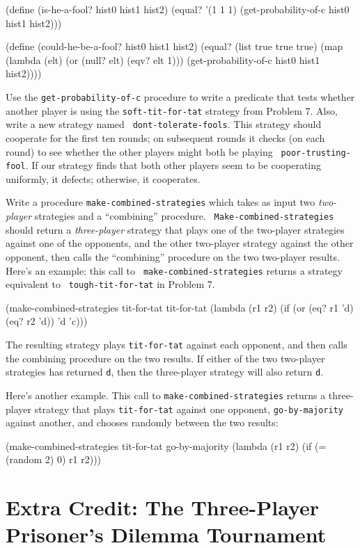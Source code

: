 \beginlisp
(define (is-he-a-fool? hist0 hist1 hist2)
  (equal? '(1 1 1) (get-probability-of-c hist0 hist1 hist2)))

(define (could-he-be-a-fool? hist0 hist1 hist2)
  (equal? (list true true true)
          (map (lambda (elt) (or (null? elt) (eqv? elt 1)))
               (get-probability-of-c hist0 hist1 hist2))))
\endlisp

Use the {\tt get-probability-of-c} procedure to write a predicate that
tests whether another player is using the {\tt soft-tit-for-tat}
strategy from Problem 7. Also, write a new strategy named {\tt
dont-tolerate-fools}.  This strategy should cooperate for the first
ten rounds; on subsequent rounds it checks (on each round) to see
whether the other players might both be playing {\tt
poor-trusting-fool}.  If our strategy finds that both other players
seem to be cooperating uniformly, it defects; otherwise, it
cooperates.


\vskip 8pt


Write a procedure {\tt make-combined-strategies} which takes as input
two {\it two-player} strategies and a ``combining'' procedure.  {\tt
Make-combined-strategies} should return a {\it three-player} strategy
that plays one of the two-player strategies against one of the
opponents, and the other two-player strategy against the other
opponent, then calls the ``combining'' procedure on the two two-player
results. Here's an example: this call to {\tt
make-combined-strategies} returns a strategy equivalent to {\tt
tough-tit-for-tat} in Problem 7.

\beginlisp
(make-combined-strategies
  tit-for-tat tit-for-tat
  (lambda (r1 r2) (if (or (eq? r1 'd) (eq? r2 'd)) 'd 'c)))
\endlisp

The resulting strategy plays {\tt tit-for-tat} against each
opponent, and then calls the combining procedure on the two results.
If either of the two two-player strategies has returned {\tt d}, then
the three-player strategy will also return {\tt d}.

Here's another example. This call to {\tt make-combined-strategies}
returns a three-player strategy that plays {\tt tit-for-tat} against
one opponent, {\tt go-by-majority} against another, and chooses randomly
between the two results:

\beginlisp
(make-combined-strategies
  tit-for-tat go-by-majority
  (lambda (r1 r2) (if (= (random 2) 0) r1 r2)))
\endlisp


\section{Extra Credit: The Three-Player Prisoner's Dilemma Tournament}



